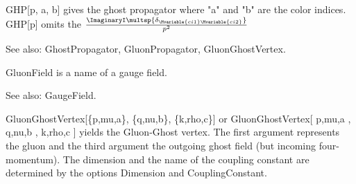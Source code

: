 

GHP[p, a, b] gives the ghost propagator where "a" and "b" are the color indices. GHP[p] omits the \(\frac{\ImaginaryI \multsp {{\delta }_{\Mvariable{ci1}\Mvariable{ci2}}}}{{p^2}}\)

See also:  GhostPropagator, GluonPropagator, GluonGhostVertex.












GluonField is a name of a gauge field.

See also:  GaugeField.








GluonGhostVertex[\{p,mu,a\}, \{q,nu,b\}, \{k,rho,c\}] or GluonGhostVertex[ p,mu,a , q,nu,b , k,rho,c ] yields the Gluon-Ghost vertex. The
  first argument represents the gluon and the third argument the outgoing ghost field (but incoming four-momentum). The dimension and the
  name of the coupling constant are determined by the options Dimension and CouplingConstant.

